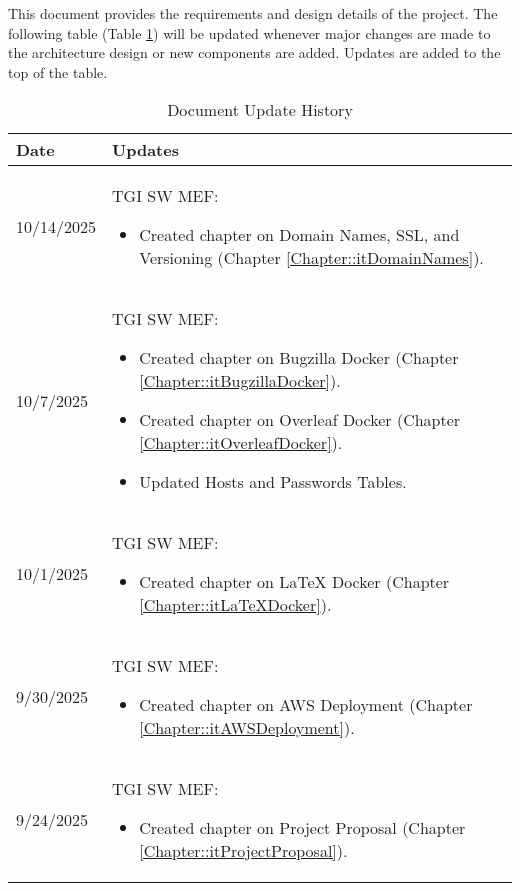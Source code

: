 This document provides the requirements and design details of the
project.  The following table (Table \ref{Table::UpdateHistory}) will be
updated whenever major changes are made to the architecture
design or new components are added. Updates are added to the top of the table.

\begin{longtable}{|l||p{13.5cm}|}
\caption{Document Update History \label{Table::UpdateHistory}}\\
\hline
\textbf{Date} & \textbf{Updates} \\
\hline 
\endhead

10/14/2025 & TGI SW MEF:
\begin{itemize}[topsep=0pt,itemsep=0pt,parsep=0pt,partopsep=0pt,leftmargin=12pt]
\item Created chapter on Domain Names, SSL, and Versioning (Chapter \ref{Chapter::itDomainNames}).
\end{itemize}
\\ \hline

10/7/2025 & TGI SW MEF:
\begin{itemize}[topsep=0pt,itemsep=0pt,parsep=0pt,partopsep=0pt,leftmargin=12pt]
\item Created chapter on Bugzilla Docker (Chapter \ref{Chapter::itBugzillaDocker}).
\item Created chapter on Overleaf Docker (Chapter \ref{Chapter::itOverleafDocker}).
\item Updated Hosts and Passwords Tables.
\end{itemize}
\\ \hline

10/1/2025 & TGI SW MEF:
\begin{itemize}[topsep=0pt,itemsep=0pt,parsep=0pt,partopsep=0pt,leftmargin=12pt]
\item Created chapter on LaTeX Docker (Chapter \ref{Chapter::itLaTeXDocker}).
\end{itemize}
\\ \hline

9/30/2025 & TGI SW MEF:
\begin{itemize}[topsep=0pt,itemsep=0pt,parsep=0pt,partopsep=0pt,leftmargin=12pt]
\item Created chapter on AWS Deployment (Chapter \ref{Chapter::itAWSDeployment}).
\end{itemize}
\\ \hline

9/24/2025 & TGI SW MEF:
\begin{itemize}[topsep=0pt,itemsep=0pt,parsep=0pt,partopsep=0pt,leftmargin=12pt]
\item Created chapter on Project Proposal (Chapter \ref{Chapter::itProjectProposal}).
\end{itemize}
\\ \hline


\end{longtable}
